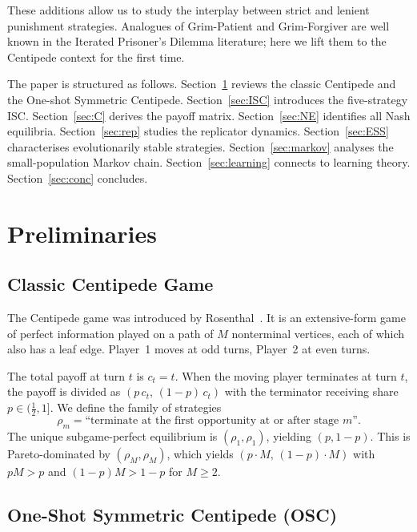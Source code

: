 \documentclass[12pt,a4paper]{article}
\begin{document}
These additions allow us to study the interplay between strict and lenient
punishment strategies.  Analogues of Grim-Patient and Grim-Forgiver are well
known in the Iterated Prisoner's Dilemma literature; here we lift them to the
Centipede context for the first time.

The paper is structured as follows.  Section~\ref{sec:prelim} reviews the
classic Centipede and the One-shot Symmetric Centipede.  Section~\ref{sec:ISC}
introduces the five-strategy ISC.  Section~\ref{sec:C} derives the payoff
matrix.  Section~\ref{sec:NE} identifies all Nash equilibria.
Section~\ref{sec:rep} studies the replicator dynamics.
Section~\ref{sec:ESS} characterises evolutionarily stable strategies.
Section~\ref{sec:markov} analyses the small-population Markov chain.
Section~\ref{sec:learning} connects to learning theory.
Section~\ref{sec:conc} concludes.

\section{Preliminaries}
\label{sec:prelim}

\subsection{Classic Centipede Game}

The Centipede game was introduced by Rosenthal~\cite{Rosenthal1981}.  It is an
extensive-form game of perfect information played on a path of $M$ nonterminal
vertices, each of which also has a leaf edge.  Player~1 moves at odd turns,
Player~2 at even turns.

The total payoff at turn $t$ is $c_t = t$.  When the moving player terminates
at turn $t$, the payoff is divided as $(p\,c_t,\,(1-p)\,c_t)$ with the
terminator receiving share $p\in(\tfrac{1}{2},1]$.  We define the family of
strategies
\[
  \rho_m = \text{``terminate at the first opportunity at or after stage }m\text{''.}
\]
The unique subgame-perfect equilibrium is $(\rho_1,\rho_1)$, yielding
$(p,1-p)$.  This is Pareto-dominated by $(\rho_M,\rho_M)$, which yields $(p\cdot M,\,(1-p)\cdot M)$ with $pM > p$ and $(1-p)M > 1-p$ for $M\geq 2$.

\subsection{One-Shot Symmetric Centipede (OSC)}
\end{document}
